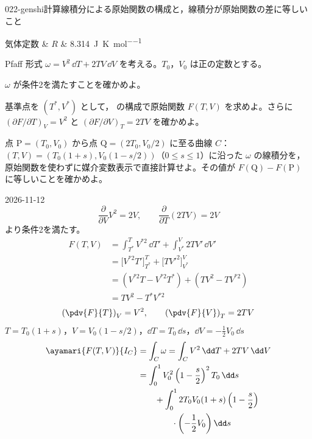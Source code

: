 \documentclass[uplatex,dvipdfmx,a4paper,11pt]{jsarticle}
\begin{document}
\begin{mondai}{022-genshi}{計算}{線積分による原始関数の構成と，線積分が原始関数の差に等しいこと}
\begin{teisuu}
  気体定数 & $R$ & \qty{8.314}{\joule\per\kelvin\per\mole}\\
\end{teisuu}
Pfaff 形式 $\omega = V^{2}\,\dd T + 2TV\,\dd V$ を考える。$T_{0}$，$V_{0}$ は正の定数とする。
  \begin{shoumon}
    \item $\omega$ が条件2を満たすことを確かめよ。
    \item 基準点を $(T^{*},V^{*})$ として， の構成で原始関数 $F(T,V)$ を求めよ。さらに $(\partial F/\partial T)_{V} = V^{2}$ と $(\partial F/\partial V)_{T} = 2TV$ を確かめよ。
    \item 点 $\mathrm{P} = (T_{0},V_{0})$ から点 $\mathrm{Q} = (2T_{0},V_{0}/2)$ に至る曲線 $C$：$(T,V) = (T_{0}(1+s),V_{0}(1-s/2))$（$0 \le s \le 1$）に沿った $\omega$ の線積分を，原始関数を使わずに媒介変数表示で直接計算せよ。その値が $F(\mathrm{Q}) - F(\mathrm{P})$ に等しいことを確かめよ。
  \end{shoumon}
\begin{kotaeutsushi}{2026-11-12}
\[ \frac{\partial}{\partial V}V^{2}=2V, \qquad \frac{\partial}{\partial T}(2TV)=2V \]
より条件2を満たす。
\begin{align*}
F(T,V)&=\int_{T^{*}}^{T}V^{*2}\,\dd T'+\int_{V^{*}}^{V}2TV'\,\dd V'\\
&=\bigl[V^{*2}T'\bigr]_{T^{*}}^{T}+\bigl[TV'^{2}\bigr]_{V^{*}}^{V}\\
&=(V^{*2}T-V^{*2}T^{*})+(TV^{2}-TV^{*2})\\
&=TV^{2}-T^{*}V^{*2}
\end{align*}
\[ \left(\pdv{F}{T}\right)_{V}=V^{2}, \qquad \left(\pdv{F}{V}\right)_{T}=2TV \]
$T=T_{0}(1+s)$，$V=V_{0}(1-s/2)$，$\dd T=T_{0}\,\dd s$，$\dd V=-\frac{1}{2}V_{0}\,\dd s$
\begin{align*}
\ayamari{F(T,V)}{I_{C}}&=\int_{C}\omega=\int_{C}V^{2}\,\dd T+2TV\,\dd V\\
&=\int_{0}^{1}V_{0}^{2}\left(1-\frac{s}{2}\right)^{2}T_{0}\,\dd s\\
&\qquad+\int_{0}^{1}2T_{0}V_{0}(1+s)\left(1-\frac{s}{2}\right)\\
&\qquad\qquad\cdot\left(-\frac{1}{2}V_{0}\right)\dd s\\

\end{align*}
\end{kotaeutsushi}
\end{mondai}
\end{document}
